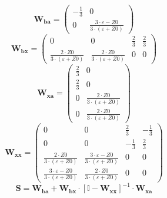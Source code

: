 \[ \mathbf{W_{ba}} = \left(\begin{array}{cc} -\frac{1}{3} & 0 \\ 0 & \frac{3\cdot \varepsilon-Z0}{3\cdot \left(\varepsilon+Z0\right)} \end{array}\right) \]
\[ \mathbf{W_{bx}} = \left(\begin{array}{cccc} 0 & 0 & \frac{2}{3} & \frac{2}{3} \\ \frac{2\cdot Z0}{3\cdot \left(\varepsilon+Z0\right)} & \frac{2\cdot Z0}{3\cdot \left(\varepsilon+Z0\right)} & 0 & 0 \end{array}\right) \]
\[ \mathbf{W_{xa}} = \left(\begin{array}{cc} \frac{2}{3} & 0 \\ \frac{2}{3} & 0 \\ 0 & \frac{2\cdot Z0}{3\cdot \left(\varepsilon+Z0\right)} \\ 0 & \frac{2\cdot Z0}{3\cdot \left(\varepsilon+Z0\right)} \end{array}\right) \]
\[ \mathbf{W_{xx}} = \left(\begin{array}{cccc} 0 & 0 & \frac{2}{3} & -\frac{1}{3} \\ 0 & 0 & -\frac{1}{3} & \frac{2}{3} \\ \frac{2\cdot Z0}{3\cdot \left(\varepsilon+Z0\right)} & \frac{3\cdot \varepsilon-Z0}{3\cdot \left(\varepsilon+Z0\right)} & 0 & 0 \\ \frac{3\cdot \varepsilon-Z0}{3\cdot \left(\varepsilon+Z0\right)} & \frac{2\cdot Z0}{3\cdot \left(\varepsilon+Z0\right)} & 0 & 0 \end{array}\right) \]
\[ \mathbf{S}=\mathbf{W_{ba}}+\mathbf{W_{bx}}\cdot\left[ \mathbb{I}  -\mathbf{W_{xx}}\right]^{-1}\cdot\mathbf{W_{xa}} \]
